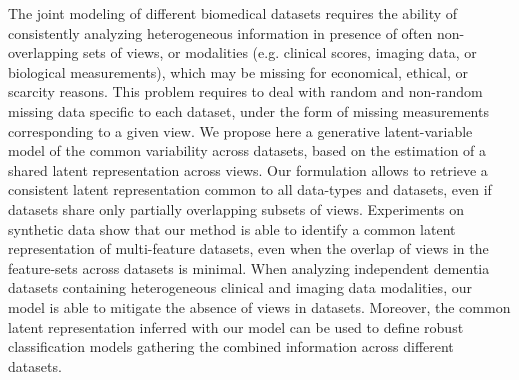 The joint modeling of different biomedical datasets requires the ability of consistently analyzing heterogeneous information in presence of often non-overlapping sets of views, or modalities (e.g. clinical scores, imaging data, or biological measurements), which may be missing for economical, ethical, or scarcity reasons.
This problem requires to deal with random and non-random missing data specific to each dataset, under the form of missing measurements corresponding to a given view.
%
We propose here a generative latent-variable model of the common variability across datasets, based on the estimation of a shared latent representation across views.
Our formulation allows to retrieve a consistent latent representation common to all data-types and datasets, even if datasets share only partially overlapping subsets of views.
%
Experiments on synthetic data show that our method is able to identify a common latent representation of multi-feature datasets, even when the overlap of views in the feature-sets across datasets is minimal.
%
When analyzing independent dementia datasets containing heterogeneous clinical and imaging data modalities, our model is able to mitigate the absence of views in datasets.
Moreover, the common latent representation inferred with our model can be used to define robust classification models gathering the combined information across different datasets.
